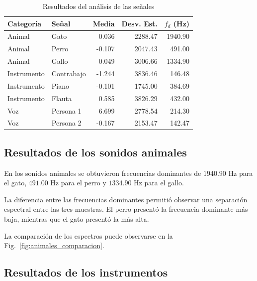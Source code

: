 \documentclass[conference]{IEEEtran}
\begin{document}
\begin{table}[!t]
\centering
\caption{Resultados del análisis de las señales}
\label{tab:resultados}

\small

\begin{tabular}{@{}l l r r r@{}}
\toprule
Categoría & Señal & Media & Desv. Est. & $f_d$ (Hz) \\
\midrule

Animal & Gato & 0.036 & 2288.47 & 1940.90 \\
Animal & Perro & -0.107 & 2047.43 & 491.00 \\
Animal & Gallo & 0.049 & 3006.66 & 1334.90 \\

\midrule

Instrumento & Contrabajo & -1.244 & 3836.46 & 146.48 \\
Instrumento & Piano & -0.101 & 1745.00 & 384.69 \\
Instrumento & Flauta & 0.585 & 3826.29 & 432.00 \\

\midrule

Voz & Persona 1 & 6.699 & 2778.54 & 214.30 \\
Voz & Persona 2 & -0.167 & 2153.47 & 142.47 \\

\bottomrule
\end{tabular}

\end{table}


\subsection{Resultados de los sonidos animales}

En los sonidos animales se obtuvieron frecuencias dominantes de $1940.90$ Hz para el gato, $491.00$ Hz para el perro y $1334.90$ Hz para el gallo.

La diferencia entre las frecuencias dominantes permitió observar una separación espectral entre las tres muestras. El perro presentó la frecuencia dominante más baja, mientras que el gato presentó la más alta.

La comparación de los espectros puede observarse en la Fig.~\ref{fig:animales_comparacion}.


\subsection{Resultados de los instrumentos}
\end{document}
